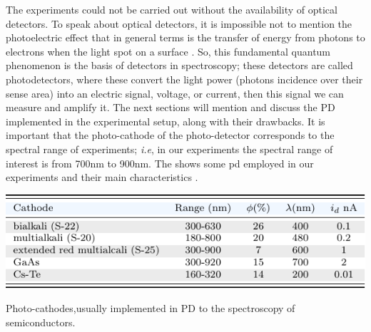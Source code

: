 The experiments could not be carried out without the availability of optical detectors.  To speak about optical detectors, it is impossible not to mention the photoelectric effect that in general terms is the transfer of energy from photons to electrons
when the light spot on a surface \cite{einstein1905uber}. So, this fundamental quantum phenomenon is the
basis of detectors in spectroscopy; these detectors are called photodetectors, where these convert the light power (photons incidence over their sense area) into an electric signal, voltage, or current, then this signal we can measure and amplify it. The next sections will mention and discuss the PD implemented in the experimental setup, along with their drawbacks.
It is important that the photo-cathode of the photo-detector corresponds to the spectral range of experiments; \textit{i.e}, in our experiments the spectral range of interest is from 700nm to 900nm. The shows some \gls{pd} employed in our experiments and their main characteristics \cite{tkachenko2006opticalspectroscopy}.
\begin{table}[b!]
	\centering
	\includegraphics[width=\textwidth]{../tables/chapter-3/table-photodetectors/out/photodetectors.pdf}
	\caption{Photo-cathodes,usually implemented in PD to the spectroscopy of semiconductors\cite{tkachenko2006opticalspectroscopy}. }
	\label{tab:chapter-3-section-samples-photodectors-materials}
\end{table}


